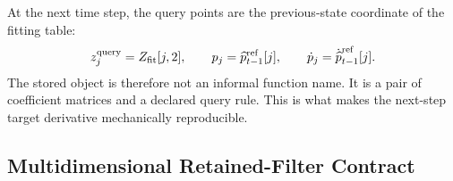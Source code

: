 \documentclass[11pt]{article}
\numberwithin{equation}{section}
\begin{document}
At the next time step, the query points are the previous-state coordinate of
the fitting table:
\begin{equation}
    z^{\rm query}_j=Z_{\rm fit}[j,2],
    \qquad
    p_j=\widehat p_{t-1}^{\rm ref}[j],
    \qquad
    \dot p_j=\dot{\widehat p}_{t-1}^{\rm ref}[j].
    \label{eq:p24-p22-k8}
\end{equation}
The stored object is therefore not an informal function name.  It is a pair of
coefficient matrices and a declared query rule.  This is what makes the
next-step target derivative mechanically reproducible.

\subsection*{Multidimensional Retained-Filter Contract}
\end{document}
